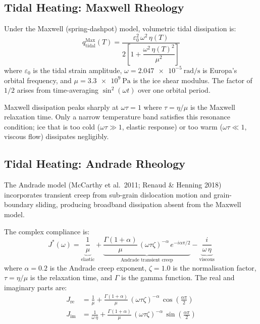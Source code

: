 \documentclass[11pt,a4paper]{article}
\begin{document}
\subsection{Tidal Heating: Maxwell Rheology}

Under the Maxwell (spring-dashpot) model, volumetric tidal dissipation is:
\begin{equation}
q_{\mathrm{tidal}}^{\mathrm{Max}}(T) =
  \frac{\varepsilon_0^2\,\omega^2\,\eta(T)}
       {2\left[1 + \dfrac{\omega^2\,\eta(T)^2}{\mu^2}\right]}
\label{eq:maxwell}
\end{equation}
where $\varepsilon_0$ is the tidal strain amplitude, $\omega =
\SI{2.047e-5}{\radian\per\second}$ is Europa's orbital frequency,
and $\mu = \SI{3.3e9}{\pascal}$ is the ice shear modulus. The factor
of $1/2$ arises from time-averaging $\sin^2(\omega t)$ over one
orbital period.

Maxwell dissipation peaks sharply at $\omega\tau = 1$ where $\tau =
\eta/\mu$ is the Maxwell relaxation time. Only a narrow temperature
band satisfies this resonance condition; ice that is too cold
($\omega\tau \gg 1$, elastic response) or too warm
($\omega\tau \ll 1$, viscous flow) dissipates negligibly.

\subsection{Tidal Heating: Andrade Rheology}

The Andrade model (McCarthy et al.\ 2011; Renaud \& Henning 2018)
incorporates transient creep from sub-grain dislocation motion and
grain-boundary sliding, producing broadband dissipation absent from
the Maxwell model.

The complex compliance is:
\begin{equation}
J^*(\omega) = \underbrace{\frac{1}{\mu}}_{\text{elastic}}
  + \underbrace{\frac{\Gamma(1+\alpha)}{\mu}\,
    (\omega\tau\zeta)^{-\alpha}\,
    e^{-i\alpha\pi/2}}_{\text{Andrade transient creep}}
  - \underbrace{\frac{i}{\omega\,\eta}}_{\text{viscous}}
\label{eq:andrade_compliance}
\end{equation}
where $\alpha = 0.2$ is the Andrade creep exponent, $\zeta = 1.0$
is the normalisation factor, $\tau = \eta/\mu$ is the relaxation time,
and $\Gamma$ is the gamma function. The real and imaginary parts are:
\begin{align}
J_{\mathrm{re}} &= \frac{1}{\mu} + \frac{\Gamma(1+\alpha)}{\mu}\,
  (\omega\tau\zeta)^{-\alpha}\,\cos\!\left(\frac{\alpha\pi}{2}\right)
\label{eq:Jre} \\
J_{\mathrm{im}} &= \frac{1}{\omega\,\eta} + \frac{\Gamma(1+\alpha)}{\mu}\,
  (\omega\tau\zeta)^{-\alpha}\,\sin\!\left(\frac{\alpha\pi}{2}\right)
\label{eq:Jim}
\end{align}
\end{document}
